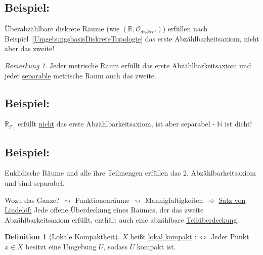 \documentclass[a4paper,11pt,notitlepage]{report}
\theoremstyle{remark}
\newtheorem{remark}{Bemerkung}[chapter]
\theoremstyle{definition}
\newtheorem{definition}{Definition}[chapter]
\newcommand{\R}{{\ensuremath{\mathbb{R}}}}
\newcommand{\N}{{\ensuremath{\mathbb{N}}}}
\newcommand{\OO}{{\ensuremath{\mathcal{O}}}}
\newenvironment{bsp}[1]
{
\setlength{\fboxsep}{10pt}
\subsection*{Beispiel: #1}
\begin{upshape}
}
{
\end{upshape}
}
\begin{document}
\begin{bsp}{}
	Überabzählbare diskrete Räume (wie $(\R, \OO_{diskret})$) erfüllen nach Beispiel~\ref{UmgebungsbasisDiskreteTopologie} das erste Abzählbarkeitsaxiom, nicht aber das zweite!
\end{bsp}
 
\begin{remark}
	Jeder metrische Raum erfüllt das erste Abzählbarkeitsaxiom und jeder \underline{separable} metrische Raum auch das zweite.
\end{remark} 
 
\begin{bsp}{}
	$\R_{\mathcal{T}_1}$ erfüllt \underline{nicht} das erste Abzählbarkeitsaxiom, ist aber separabel - $\N$ ist dicht!
\end{bsp} 
 
\begin{bsp}{}
	Euklidische Räume und alle ihre Teilmengen erfüllen das 2. Abzählbarkeitsaxiom und sind separabel.
\end{bsp} 
 
Wozu das Ganze? 
\newline $\rightsquigarrow$ Funktionenräume
\newline $\rightsquigarrow$ Mannigfaltigkeiten
\newline $\rightsquigarrow$ \underline{Satz von Lindelöf:}
Jede offene Überdeckung eines Raumes, der das zweite Abzählbarkeitsaxiom erfüllt, enthält auch eine abzählbare \underline{Teilüberdeckung}.
 
\begin{definition}[Lokale Kompaktheit]
$X$ heißt \underline{\underline{lokal} kompakt} \newline $:\Leftrightarrow$ Jeder Punkt $x \in X$ besitzt eine Umgebung $U$, sodass $\overline{U}$ kompakt ist.
\end{definition} 
\end{document}
